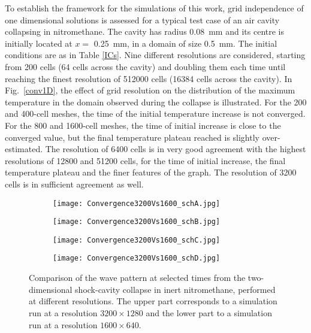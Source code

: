 \documentclass[3p,times,twocolumn]{elsarticle}
\begin{document}
To establish the framework for the simulations of this work, grid independence of
one dimensional solutions is assessed for a typical test case of an air cavity
collapsing in nitromethane. The cavity has radius  \SI{0.08}{\milli \meter}
and its centre is initially located at $x=$ \SI{0.25}{\milli \meter},
in a domain of size  \SI{0.5}{\milli \meter}. The initial conditions are as in Table \ref{ICs}.
Nine different resolutions are considered,
starting from 200 cells (64 cells across the cavity) and doubling them each
time until reaching the finest resolution of 512000 cells (16384 cells across
the cavity). In Fig.\  \ref{conv1D}, the effect of grid resolution on the distribution
of the maximum temperature in the domain observed during the collapse is
illustrated. 
 For the 200 and 400-cell meshes, the time of the initial temperature  increase
is not converged. For the 800 and 1600-cell meshes, the time of initial
increase is close to the converged value, but the final temperature plateau
reached is slightly over-estimated.
The resolution of 6400 cells is in very good agreement with the highest resolutions
of 12800 and 51200 cells, for the time of initial increase, the final temperature
plateau and the finer features of the graph. The resolution of 3200 cells
is
in sufficient agreement as well.  

\begin{figure*}
\centering
        \begin{subfigure}[b]{0.24\textwidth}
\texttt{[image: Convergence3200Vs1600\_schA.jpg]}
        \end{subfigure}
        \begin{subfigure}[b]{0.24\textwidth}
 \texttt{[image: Convergence3200Vs1600\_schB.jpg]}
        \end{subfigure}
\begin{subfigure}[b]{0.24\textwidth}
\texttt{[image: Convergence3200Vs1600\_schC.jpg]}
        \end{subfigure}
\begin{subfigure}[b]{0.24\textwidth}
\texttt{[image: Convergence3200Vs1600\_schD.jpg]}
        \end{subfigure}
\caption{Comparison of the wave pattern at selected times from the two-dimensional shock-cavity collapse in inert nitromethane, performed at different resolutions. The upper part corresponds to a simulation run at a resolution $3200\times1280$ and the lower part to a simulation run at a resolution $1600\times640$.}
\label{conv_sch}
\end{figure*}
\end{document}
